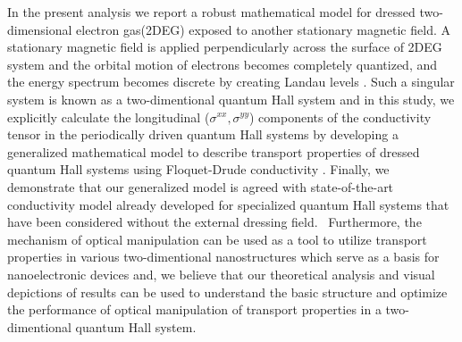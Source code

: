 In the present analysis we report a robust mathematical model for dressed two-dimensional electron gas(2DEG) exposed to another stationary magnetic field.
A stationary magnetic field is applied perpendicularly across the surface of 2DEG system and the orbital motion of electrons becomes completely quantized, and the energy spectrum becomes discrete by creating Landau levels \cite{landau30}.
Such a singular system is known as a two-dimentional quantum Hall system and in this study, we explicitly calculate the longitudinal  ($\sigma^{xx},\sigma^{yy}$) components of the conductivity tensor in the periodically driven quantum Hall systems by developing a generalized mathematical model to describe transport properties of dressed quantum Hall systems using Floquet-Drude conductivity \cite{wackerl20}.
Finally, we demonstrate that our generalized model is agreed with state-of-the-art conductivity model \cite{endo09} already developed for specialized quantum Hall systems that have been considered without the external dressing field. 
Furthermore, the mechanism of optical manipulation can be used as a tool to utilize transport properties in various two-dimentional nanostructures which serve as a basis for nanoelectronic devices and, we believe that our theoretical analysis and visual depictions of results can be used to understand the basic structure and optimize the performance of optical manipulation of transport properties in a two-dimentional quantum Hall system.
